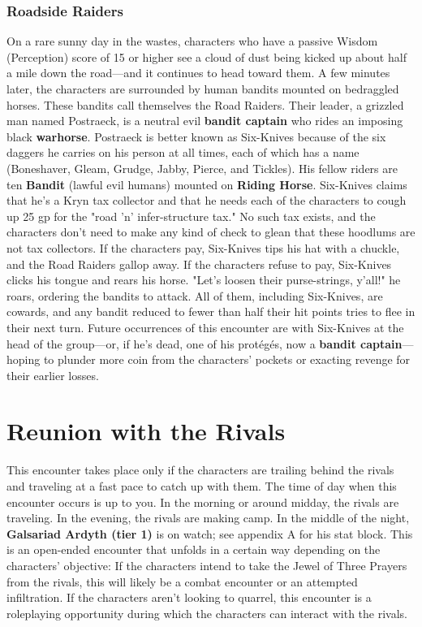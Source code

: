 \documentclass[10pt,a4,twoside,twocolumn,openany,nodeprecatedcode]{dndbook}
\begin{document}
\subsubsection{Roadside Raiders}
On a rare sunny day in the wastes, characters who have a passive Wisdom (Perception) score of 15 or higher see a cloud of dust being kicked up about half a mile down the road—and it continues to head toward them. A few minutes later, the characters are surrounded by human bandits mounted on bedraggled horses. These bandits call themselves the Road Raiders. Their leader, a grizzled man named Postraeck, is a neutral evil \textbf{bandit captain} who rides an imposing black \textbf{warhorse}. Postraeck is better known as Six-Knives because of the six daggers he carries on his person at all times, each of which has a name (Boneshaver, Gleam, Grudge, Jabby, Pierce, and Tickles). His fellow riders are ten \textbf{Bandit} (lawful evil humans) mounted on \textbf{Riding Horse}.
Six-Knives claims that he's a Kryn tax collector and that he needs each of the characters to cough up 25 gp for the "road 'n' infer-structure tax." No such tax exists, and the characters don't need to make any kind of check to glean that these hoodlums are not tax collectors. If the characters pay, Six-Knives tips his hat with a chuckle, and the Road Raiders gallop away.
If the characters refuse to pay, Six-Knives clicks his tongue and rears his horse. "Let's loosen their purse-strings, y'all!" he roars, ordering the bandits to attack. All of them, including Six-Knives, are cowards, and any bandit reduced to fewer than half their hit points tries to flee in their next turn.
Future occurrences of this encounter are with Six-Knives at the head of the group—or, if he's dead, one of his protégés, now a \textbf{bandit captain}—hoping to plunder more coin from the characters' pockets or exacting revenge for their earlier losses.
\section{Reunion with the Rivals}
This encounter takes place only if the characters are trailing behind the rivals and traveling at a fast pace to catch up with them. The time of day when this encounter occurs is up to you. In the morning or around midday, the rivals are traveling. In the evening, the rivals are making camp. In the middle of the night, \textbf{Galsariad Ardyth (tier 1)} is on watch; see appendix A for his stat block.
This is an open-ended encounter that unfolds in a certain way depending on the characters' objective:
{{If the characters intend to take the Jewel of Three Prayers from the rivals, this will likely be a combat encounter or an attempted infiltration.}}
{{If the characters aren't looking to quarrel, this encounter is a roleplaying opportunity during which the characters can interact with the rivals.}}
\end{document}

